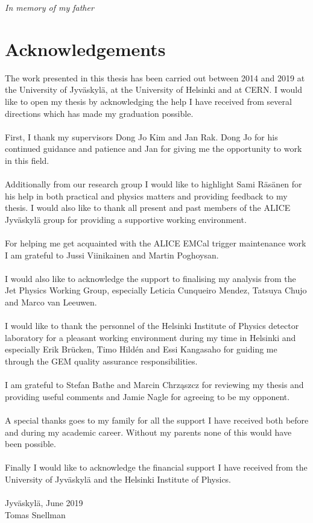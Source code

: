 \clearpage
\begin{flushright}
    \thispagestyle{empty}
    \vspace*{\fill}
    \emph{In memory of my father}
    \vspace*{\fill}
\end{flushright}
\clearpage

\section*{Acknowledgements} 

The work presented in this thesis has been carried out between 2014 and 2019 at the University of Jyväskylä, at the University of Helsinki and at CERN. I would like to open my thesis by acknowledging the help I have received from several directions which has made my graduation possible.
\\~\\
\noindent
First, I thank my supervisors Dong Jo Kim and Jan Rak. Dong Jo for his continued guidance and patience and Jan for giving me the opportunity to work in this field.
\\~\\
\noindent
Additionally from our research group I would like to highlight Sami Räsänen for his help in both practical and physics matters and providing feedback to my thesis. I would also like to thank all present and past members of the ALICE Jyväskylä group for providing a supportive working environment.
\\~\\
\noindent For helping me get acquainted with the ALICE EMCal trigger maintenance work I am grateful to Jussi Viinikainen and Martin Poghoysan.
\\~\\
\noindent I would also like to acknowledge the support to finalising my analysis from the Jet Physics Working Group, especially Leticia Cunqueiro Mendez, Tatsuya Chujo and Marco van Leeuwen.
\\~\\
\noindent
I would like to thank the personnel of the Helsinki Institute of Physics detector laboratory for a pleasant working environment during my time in Helsinki and especially Erik Brücken, Timo Hildén and Essi Kangasaho for guiding me through the GEM quality assurance responsibilities. 
\\~\\
\noindent
I am grateful to Stefan Bathe and Marcin Chrząszcz for reviewing my thesis and providing useful comments and Jamie Nagle for agreeing to be my opponent.
\\~\\
\noindent
A special thanks goes to my family for all the support I have received both before and during my academic career. Without my parents none of this would have been possible.
\\~\\
\noindent
Finally I would like to acknowledge the financial support I have received from the University of Jyväskylä and the Helsinki Institute of Physics.
\\~\\
Jyväskylä, June 2019\\
Tomas Snellman
